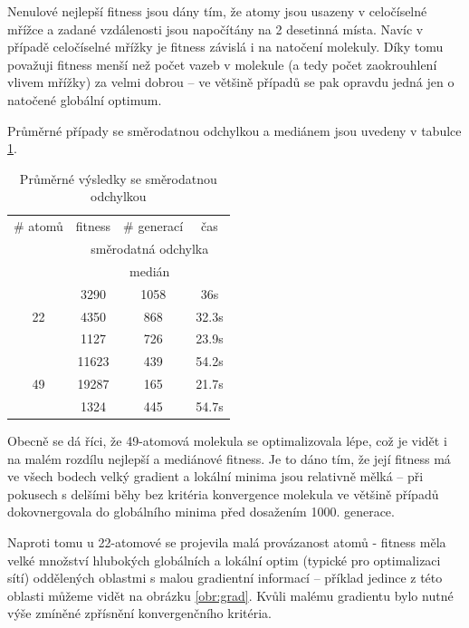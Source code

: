 \documentclass[journal]{IEEEtrancz}
\begin{document}
Nenulové nejlepší fitness jsou dány tím, že atomy jsou usazeny v celočíselné mřížce a zadané vzdálenosti jsou napočítány na 2 desetinná místa. Navíc v případě celočíselné mřížky je fitness závislá i na natočení molekuly. Díky tomu považuji fitness menší než počet vazeb v molekule (a tedy počet zaokrouhlení vlivem mřížky) za velmi dobrou -- ve většině případů se pak opravdu jedná jen o natočené globální optimum.

Průměrné případy se směrodatnou odchylkou a mediánem jsou uvedeny v tabulce \ref{tab:avgconv}. 

\begin{table}[h]
  \centering
  \caption{Průměrné výsledky se směrodatnou odchylkou}
  \begin{tabular}{cccc}
  \toprule
   \# atomů & fitness & \# generací & čas \\
   & \multicolumn{3}{c}{směrodatná odchylka}\\
   & \multicolumn{3}{c}{medián}\\
  \midrule
  \multirow{3}{*}{22} & 3290 & 1058 & 36s\\
                      & 4350 & 868 & 32.3s\\
                      & 1127 & 726 & 23.9s \\
  \multirow{3}{*}{49} & 11623 & 439 & 54.2s\\
                      & 19287 & 165 & 21.7s\\
                      & 1324  & 445 & 54.7s\\
  \bottomrule
  \end{tabular}
  \label{tab:avgconv}
\end{table}

Obecně se dá říci, že 49-atomová molekula se optimalizovala lépe, což je vidět i na malém rozdílu nejlepší a mediánové fitness. Je to dáno tím, že její fitness má ve všech bodech velký gradient a lokální minima jsou relativně mělká -- při pokusech s delšími běhy bez kritéria konvergence molekula ve většině případů dokovnergovala do globálního minima před dosažením 1000. generace.

Naproti tomu u 22-atomové se projevila malá provázanost atomů - fitness měla velké množství hlubokých globálních a lokální optim (typické pro optimalizaci sítí) oddělených oblastmi s malou gradientní informací -- příklad jedince z této oblasti můžeme vidět na obrázku \ref{obr:grad}. Kvůli malému gradientu bylo nutné výše zmíněné zpřísnění konvergenčního kritéria.
\end{document}
